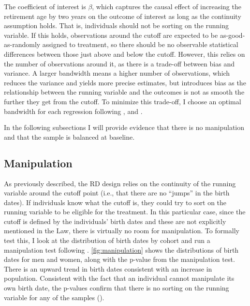\documentclass[12pt, a4paper]{article}
\begin{document}
The coefficient of interest is $\beta$, which captures the causal effect of increasing the retirement age by two years on the outcome of interest as long as the continuity assumption holds. That is, individuals should not be sorting on the running variable. If this holds, observations around the cutoff are expected to be as-good-as-randomly assigned to treatment, so there should be no observable statistical differences between those just above and below the cutoff. However, this relies on the number of observations around it, as there is a trade-off between bias and variance. A larger bandwidth means a higher number of observations, which reduces the variance and yields more precise estimates, but introduces bias as the relationship between the running variable and the outcomes is not as smooth the further they get from the cutoff. To minimize this trade-off, I choose an optimal bandwidth for each regression following \citet{calonico2014robust}, and \citet{calonico2020optimal}.

In the following subsections I will provide evidence that there is no manipulation and that the sample is balanced at baseline.


\subsection{Manipulation}
As previously described, the RD design relies on the continuity of the running variable around the cutoff point (i.e., that there are no ``jumps'' in the birth dates). If individuals know what the cutoff is, they could try to sort on the running variable to be eligible for the treatment. In this particular case, since the cutoff is defined by the individuals' birth dates and these are not explicitly mentioned in the Law, there is virtually no room for manipulation. To formally test this, I look at the distribution of birth dates by cohort and run a manipulation test following \citet{mccrary2008manipulation}. \autoref{fig:manipulation} shows the distributions of birth dates for men and women, along with the p-value from the manipulation test. There is an upward trend in birth dates consistent with an increase in population. Consistent with the fact that an individual cannot manipulate its own birth date, the p-values confirm that there is no sorting on the running variable for any of the samples ().
\end{document}
